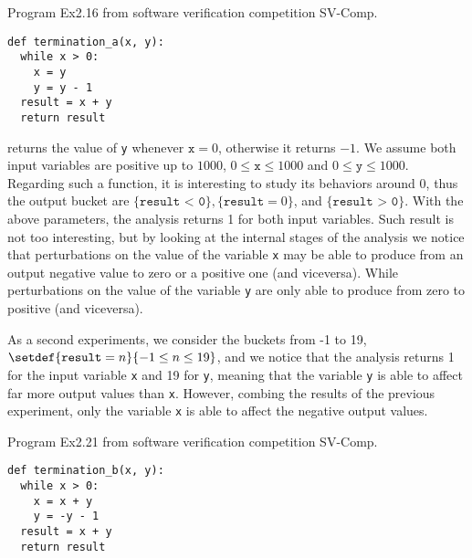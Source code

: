 \begin{marginlisting}
  \caption{Program Ex2.16 from software verification competition SV-Comp.}
  \vspace{15pt}
\begin{lstlisting}[style=mystyle,
  language=customPython,
  escapechar=\%,
]
def termination_a(x, y):
  while x > 0:
    x = y
    y = y - 1
  result = x + y
  return result
\end{lstlisting}
\end{marginlisting}


 returns the value of \texttt{y} whenever $\texttt{x} = 0$, otherwise it returns $-1$.
We assume both input variables are positive up to $1000$, $0 \le \texttt{x} \le 1000$ and $0 \le \texttt{y} \le 1000$.
Regarding such a function, it is interesting to study its behaviors around $0$, thus the output bucket are $\{ \texttt{result < 0} \}, \{ \texttt{result} = 0 \}$, and $\{ \texttt{result > 0} \}$.
With the above parameters, the analysis \abstractoutcomesname{} returns 1 for both input variables.
Such result is not too interesting, but by looking at the internal stages of the analysis we notice that perturbations on the value of the variable \texttt{x} may be able to produce from an output negative value to zero or a positive one (and viceversa).
While perturbations on the value of the variable \texttt{y} are only able to produce from zero to positive (and viceversa).

As a second experiments, we consider the buckets from -1 to 19, $\setdef{ \texttt{result} = n}{-1 \le n \le 19}$, and we notice that the analysis \abstractoutcomesname{} returns 1 for the input variable \texttt{x} and 19 for \texttt{y}, meaning that the variable \texttt{y} is able to affect far more output values than \texttt{x}. However, combing the results of the previous experiment, only the variable \texttt{x} is able to affect the negative output values.

\begin{marginlisting}[-1.4cm]
  \caption{Program Ex2.21 from software verification competition SV-Comp.}
  \vspace{15pt}
\begin{lstlisting}[style=mystyle,
  language=customPython,
  escapechar=\%,
]
def termination_b(x, y):
  while x > 0:
    x = x + y
    y = -y - 1
  result = x + y
  return result
\end{lstlisting}
\end{marginlisting}

